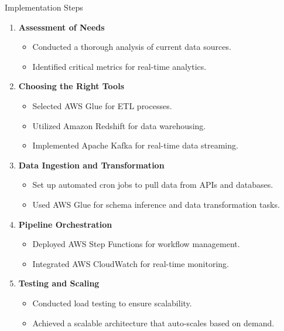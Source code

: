 \documentclass[aspectratio=169]{beamer}
\begin{document}
\begin{frame}[fragile]{Implementation Steps}
    \begin{enumerate}
        \item \textbf{Assessment of Needs}
            \begin{itemize}
                \item Conducted a thorough analysis of current data sources.
                \item Identified critical metrics for real-time analytics.
            \end{itemize}

        \item \textbf{Choosing the Right Tools}
            \begin{itemize}
                \item Selected AWS Glue for ETL processes.
                \item Utilized Amazon Redshift for data warehousing.
                \item Implemented Apache Kafka for real-time data streaming.
            \end{itemize}

        \item \textbf{Data Ingestion and Transformation}
            \begin{itemize}
                \item Set up automated cron jobs to pull data from APIs and databases.
                \item Used AWS Glue for schema inference and data transformation tasks.
            \end{itemize}

        \item \textbf{Pipeline Orchestration}
            \begin{itemize}
                \item Deployed AWS Step Functions for workflow management.
                \item Integrated AWS CloudWatch for real-time monitoring.
            \end{itemize}

        \item \textbf{Testing and Scaling}
            \begin{itemize}
                \item Conducted load testing to ensure scalability.
                \item Achieved a scalable architecture that auto-scales based on demand.
            \end{itemize}
    \end{enumerate}
\end{frame}
\end{document}
